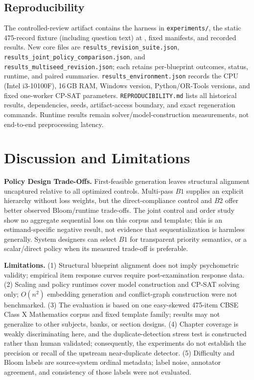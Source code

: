 \documentclass[runningheads]{llncs}
\begin{document}
\subsection{Reproducibility}
The controlled-review artifact contains the harness in \texttt{experiments/}, the static 475-record fixture (including question text) at , fixed manifests, and recorded results. New core files are \texttt{results\_revision\_suite.json}, \texttt{results\_joint\_policy\_comparison.json}, and \texttt{results\_multiseed\_revision.json}; each retains per-blueprint outcomes, status, runtime, and paired summaries. \texttt{results\_environment.json} records the CPU (Intel i3-10100F), 16\,GB RAM, Windows version, Python/OR-Tools versions, and fixed one-worker CP-SAT parameters. \texttt{REPRODUCIBILITY.md} lists all historical results, dependencies, seeds, artifact-access boundary, and exact regeneration commands. Runtime results remain solver/model-construction measurements, not end-to-end preprocessing latency.

\section{Discussion and Limitations}
\label{sec:discussion}

\noindent\textbf{Policy Design Trade-Offs.} First-feasible generation leaves structural alignment uncaptured relative to all optimized controls. Multi-pass $B1$ supplies an explicit hierarchy without loss weights, but the direct-compliance control and $B2$ offer better observed Bloom/runtime trade-offs. The joint control and order study show no aggregate sequential loss on this corpus and template; this is an estimand-specific negative result, not evidence that sequentialization is harmless generally. System designers can select $B1$ for transparent priority semantics, or a scalar/direct policy when its measured trade-off is preferable.

\noindent\textbf{Limitations.} (1) Structural blueprint alignment does not imply psychometric validity; empirical item response curves require post-examination response data. (2) Scaling and policy runtimes cover model construction and CP-SAT solving only; $O(n^2)$ embedding generation and conflict-graph construction were not benchmarked. (3) The evaluation is based on one easy-skewed 475-item CBSE Class X Mathematics corpus and fixed template family; results may not generalize to other subjects, banks, or section designs. (4) Chapter coverage is weakly discriminating here, and the duplicate-detection stress test is constructed rather than human validated; consequently, the experiments do not establish the precision or recall of the upstream near-duplicate detector. (5) Difficulty and Bloom labels are source-system ordinal metadata; label noise, annotator agreement, and consistency of those labels were not evaluated.
\end{document}
